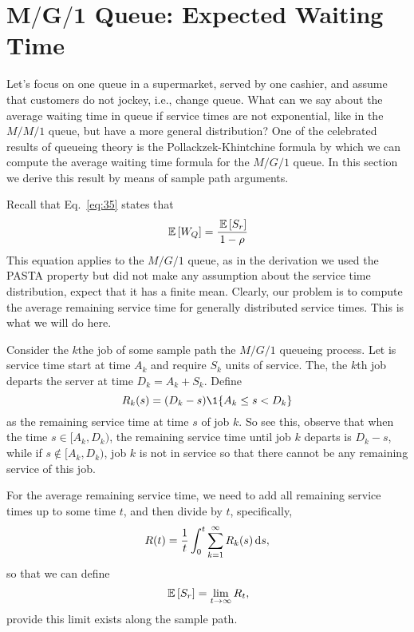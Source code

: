 \section
[$M/G/1$ Queue: Expected Waiting Time]
{$\mathbf{M/G/1}$ Queue: Expected Waiting Time}
\label{sec:mg1}

Let's focus on one queue in a supermarket, served by one cashier, and
assume that customers do not jockey, i.e., change queue. What can we
say about the average waiting time in queue if service times are not
exponential, like in the $M/M/1$ queue, but have a more general
distribution? One of the celebrated results of queueing theory is the
Pollackzek-Khintchine formula by which we can compute the average
waiting time formula for the $M/G/1$ queue. In this section we derive
this result by means of sample path arguments.

Recall that Eq.~\eqref{eq:35} states that
\begin{equation*}
  \,\mathbb{E}\left[W_Q\right] = \frac{\,\mathbb{E}\left[S_r\right]}{1-\rho}
\end{equation*}
This equation applies to the $M/G/1$ queue, as in the derivation we
used the PASTA property but did not make any assumption about the
service time distribution, expect that it has a finite mean. Clearly,
our problem is to compute the average remaining service time for
generally distributed service times. This is what we will do here.

Consider the $k$the job of some sample path the $M/G/1$ queueing
process. Let is service time start at time $A_k$ and require $S_k$
units of service. The, the $k$th job departs the server at time
$D_k=A_k + S_k$. Define
\begin{equation*}
R_k(s) = (D_k-s)\1{A_k \leq s < D_k}
\end{equation*}
as the remaining service time at time $s$ of job $k$. So see this,
observe that when the time $s\in [A_k, D_k)$, the remaining service
time until job $k$ departs is $D_k-s $, while if
$s\not \in [A_k, D_k)$, job $k$ is not in service so that there cannot
be any remaining service of this job.

For the average remaining service time, we need to add all remaining
service times up to some time $t$, and then divide by $t$,
specifically,
\begin{equation*}
R(t) = \frac{1}t \int_0^t \sum_{k=1}^\infty R_k(s) \,\text{d}s,
\end{equation*}
so that we can define
\begin{equation*}
  \,\mathbb{E}\left[S_r\right] = \lim_{t\to\infty} R_t,
\end{equation*}
provide this limit exists along the sample path.

